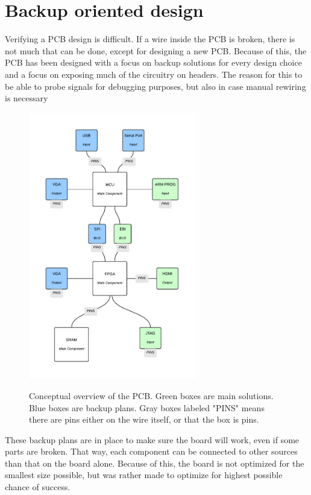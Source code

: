 \documentclass[../main/report.tex]{subfiles}
\begin{document}
\section{Backup oriented design}

Verifying a PCB design is difficult.
If a wire inside the PCB is broken, there is not much that can be done, except for designing a new PCB.
Because of this, the PCB has been designed with a focus on backup solutions for every design choice and a focus on exposing much of the circuitry on headers.
The reason for this to be able to probe signals for debugging purposes, but also in case manual rewiring is necessary 
\begin{figure}[H]
    \centering
    \includegraphics[width=0.65\textwidth]{../pcb/assets/pcb-overview.pdf}
    \label{fig:pcb-overview}
    \caption{Conceptual overview of the PCB. Green boxes are main solutions. Blue boxes are backup plans.
             Gray boxes labeled "PINS" means there are pins either on the wire itself, or that the box is pins.}
\end{figure}

These backup plans are in place to make sure the board will work, even if some parts are broken.
That way, each component can be connected to other sources than that on the board alone.
Because of this, the board is not optimized for the smallest size possible, but was rather made to optimize for highest possible chance of success.
\end{document}
